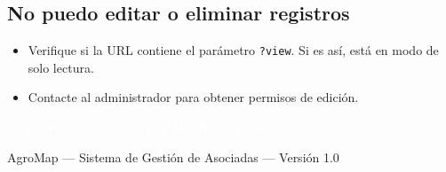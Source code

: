 \documentclass[12pt]{article}
\begin{document}
\subsection{No puedo editar o eliminar registros}
\begin{itemize}[nosep]
  \item Verifique si la URL contiene el parámetro \texttt{?view}. Si es así, está en modo de solo lectura.
  \item Contacte al administrador para obtener permisos de edición.
\end{itemize}

\vfill
\begin{center}
\begin{tcolorbox}[colback=primary!90, colframe=primary, arc=8pt, width=0.6\textwidth, center]
  \centering\textcolor{white}{\large\textbf{Software desarrollado por WolfEnterprise}}
\end{tcolorbox}
\vspace{0.5cm}
{\small AgroMap --- Sistema de Gestión de Asociadas --- Versión 1.0}
\end{center}
\end{document}
